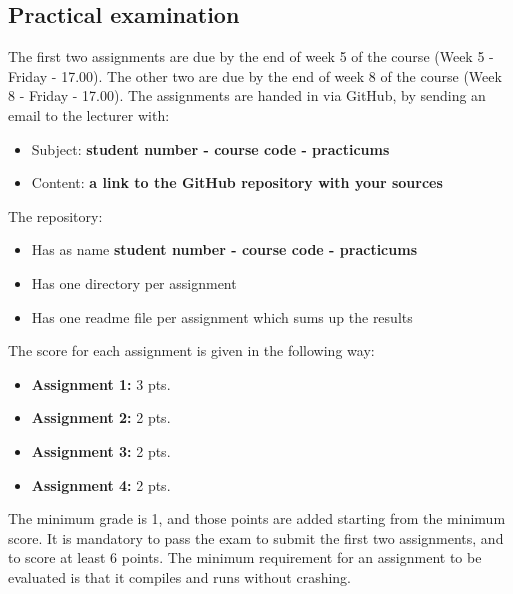 	\subsection{Practical examination}
		The first two assignments are  due by the end of week 5 of the course (Week 5 - Friday - 17.00). The other two are due by the end of week 8 of the course (Week 8 - Friday - 17.00).  The assignments are handed in via GitHub, by sending an email to the lecturer with:
		
		\begin{itemize}
			\item Subject: \textbf{student number - course code - practicums}
			\item Content: \textbf{a link to the GitHub repository with your sources}			
		\end{itemize}
		
		The repository:
		
		\begin{itemize}
			\item Has as name \textbf{student number - course code - practicums}
			\item Has one directory per assignment
			\item Has one readme file per assignment which sums up the results
		\end{itemize}
		
		The score for each assignment is given in the following way:
		\begin{itemize}
		\item \textbf{Assignment 1: } 3 pts.
		\item \textbf{Assignment 2: } 2 pts.
		\item \textbf{Assignment 3: } 2 pts.
		\item \textbf{Assignment 4: } 2 pts.
		\end{itemize}
		
		The minimum grade is 1, and those points are added starting from the minimum score. It is mandatory to pass the exam to submit the first two assignments, and to score at least 6 points. The minimum requirement for an assignment to be evaluated is that it compiles and runs without crashing.
